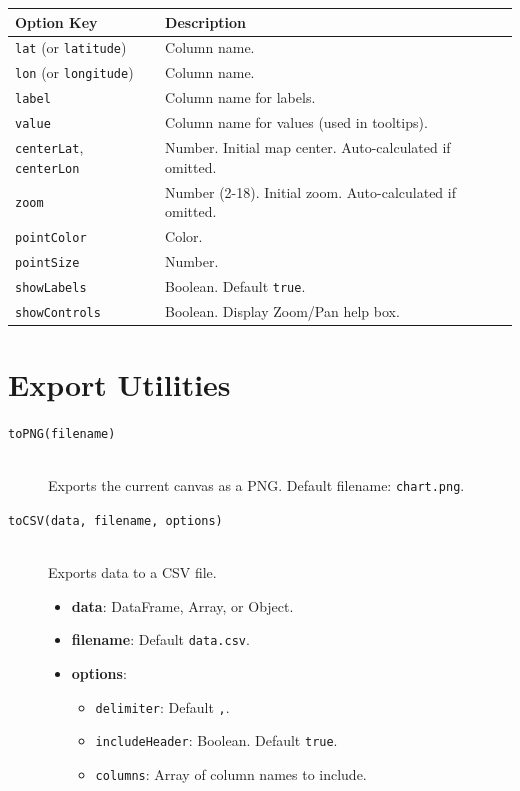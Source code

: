 \documentclass[10pt, a4paper]{article}
\begin{document}
\begin{longtable}{p{5cm} p{10cm}}
\toprule
\textbf{Option Key} & \textbf{Description} \\
\midrule
\texttt{lat} (or \texttt{latitude}) & Column name. \\
\texttt{lon} (or \texttt{longitude}) & Column name. \\
\texttt{label} & Column name for labels. \\
\texttt{value} & Column name for values (used in tooltips). \\
\texttt{centerLat}, \texttt{centerLon} & Number. Initial map center. Auto-calculated if omitted. \\
\texttt{zoom} & Number (2-18). Initial zoom. Auto-calculated if omitted. \\
\texttt{pointColor} & Color. \\
\texttt{pointSize} & Number. \\
\texttt{showLabels} & Boolean. Default \texttt{true}. \\
\texttt{showControls} & Boolean. Display Zoom/Pan help box. \\
\bottomrule
\end{longtable}

\section{Export Utilities}

\begin{description}
    \item[\texttt{toPNG(filename)}] \hfill \\
    Exports the current canvas as a PNG. Default filename: \texttt{chart.png}.
    
    \item[\texttt{toCSV(data, filename, options)}] \hfill \\
    Exports data to a CSV file.
    \begin{itemize}
        \item \textbf{data}: DataFrame, Array, or Object.
        \item \textbf{filename}: Default \texttt{data.csv}.
        \item \textbf{options}:
        \begin{itemize}
            \item \texttt{delimiter}: Default \texttt{,}.
            \item \texttt{includeHeader}: Boolean. Default \texttt{true}.
            \item \texttt{columns}: Array of column names to include.
        \end{itemize}
    \end{itemize}
\end{description}
\end{document}
